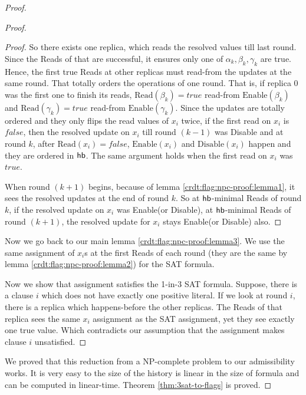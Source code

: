 \begin{proof}
\begin{proof}
\begin{proof}
    So there exists one replica, which reads the resolved values till last round. Since the \textrm{Read}s of that are successful, it ensures only one of $\alpha_k, \beta_k, \gamma_k$ are true. Hence, the first true \textrm{Read}s at other replicas must read-from the updates at the same round. That totally orders the operations of one round. That is, if replica 0 was the first one to finish its reads, $\mathrm{Read}(\beta_k) = true$ read-from $\mathrm{Enable}(\beta_k)$ and $\mathrm{Read}(\gamma_k) = true$ read-from $\mathrm{Enable}(\gamma_k)$. Since the updates are totally ordered and they only flips the read values of $x_i$ twice, \ie if the first read on $x_i$ is $false$, then the resolved update on $x_i$ till round $(k-1)$ was \textrm{Disable} and at round $k$, after $\mathrm{Read}(x_i) = false$, $\mathrm{Enable}(x_i)$ and $\mathrm{Disable}(x_i)$ happen and they are ordered in $\textsf{hb}$. The same argument holds when the first read on $x_i$ was $true$. 

    When round $(k+1)$ begins, because of lemma \ref{crdt:flag:npc-proof:lemma1}, it sees the resolved updates at the end of round $k$. So at $\textsf{hb}$-minimal \textrm{Read}s of round $k$, if the resolved update on $x_i$ was \textrm{Enable}(or \textrm{Disable}), at $\textsf{hb}$-minimal \textrm{Read}s of round $(k+1)$, the resolved update for $x_i$ stays \textrm{Enable}(or \textrm{Disable}) also.
  \end{proof}

  Now we go back to our main lemma \ref{crdt:flag:npc-proof:lemma3}. We use the same assignment of $x_i$s at the first \textrm{Read}s of each round (they are the same by lemma \ref{crdt:flag:npc-proof:lemma2}) for the SAT formula.

  Now we show that assignment satisfies the 1-in-3 SAT formula. Suppose, there is a clause $i$ which does not have exactly one positive literal. If we look at round $i$, there is a replica which happens-before the other replicas. The \textrm{Read}s of that replica sees the same $x_i$ assignment as the SAT assignment, yet they see exactly one true value. Which contradicts our assumption that the assignment makes clause $i$ unsatisfied.
\end{proof}

We proved that this reduction from a NP-complete problem to our admissibility works. It is very easy to the size of the history is linear in the size of formula and can be computed in linear-time. Theorem \ref{thm:3sat-to-flags} is proved.


\end{proof}
